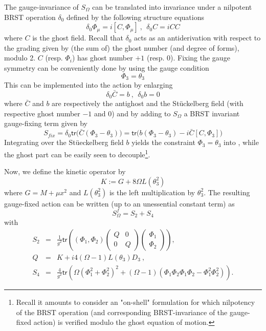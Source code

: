 \documentclass[10pt]{book}
\newcommand{\tr}{\mathsf{tr}}
\theoremstyle{break}
\begin{document}
%
The gauge-invariance of $S_\Omega$ %
can be translated into invariance under a nilpotent BRST operation $\delta_0$ defined by the following structure equations %
%
\begin{equation*}
\delta_0 \Phi_\mu = i [C,\Phi_\mu] \ , \ \ \delta_0C=iCC%
\end{equation*}
%
where $C$ is the ghost field. Recall that $\delta_0$ acts as an antiderivation with respect to the grading given by (the sum of) the ghost number (and degree of forms), modulo 2. $C$ (resp. $\Phi_i$) has ghost number $+1$ (resp. $0$). Fixing the gauge symmetry can be conveniently done by using the gauge condition 
\begin{equation*}
\Phi_3=\theta_3%
\end{equation*}
This can be implemented into the action by enlarging %
%
\begin{equation*}
\delta_0 {\bar{C}} = b \ , \ \ \delta_0b = 0 %
\end{equation*}
%
where ${\bar{C}}$ and $b$ are respectively the antighost and the St\"uckelberg field (with respective ghost number $-1$ and $0$) and by adding to $S_\Omega$ a BRST invariant gauge-fixing term given by %
%
\begin{equation*}
S_{fix}=\delta_0\tr\big({\bar{C}}(\Phi_3-\theta_3) \big)=\tr\big(b(\Phi_3-\theta_3)-i{\bar{C}}[C,\Phi_3]\big)%
\end{equation*}
%
Integrating over the St\"ueckelberg field $b$ yields the constraint $\Phi_3=\theta_3$ into %
, while the ghost part can be easily seen to decouple{\footnote{Recall it amounts to consider an "on-shell" formulation for which nilpotency of the BRST operation (and corresponding BRST-invariance of the gauge-fixed action) is verified modulo the ghost equation of motion.}}. \par 
Now, we define the kinetic operator by%
%
\begin{equation*}
K:=G+8\Omega L(\theta_3^2)%
\end{equation*}
where $G=M+\mu x^2$ and $L(\theta^{2}_{3})$ is the left multiplication by $\theta^{2}_{3}$.
%
The resulting gauge-fixed action can be written (up to an unessential constant term) as
%
\begin{equation*}
S^f_\Omega=S_2+S_4%
\end{equation*}
with%
\begin{eqnarray*}
S_2 &=& \frac{1}{g^2} \tr ((\Phi_1,\Phi_2)
\begin{pmatrix}
Q&0\\
0&Q
\end{pmatrix} 
\begin{pmatrix}
\Phi_1\\
\Phi_2
\end{pmatrix} 
) , \nonumber \\
Q &=& K + i4 (\Omega-1) L(\theta_3) D_3 \ , %
\\[5pt]
S_4 &=& \frac{4}{g^2} \tr \left( \Omega (\Phi_1^2 + \Phi_2^2)^2 + (\Omega-1)(\Phi_1\Phi_2\Phi_1\Phi_2 - \Phi_1^2\Phi_2^2) \right) . %
\end{eqnarray*}
\end{document}
